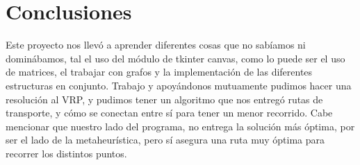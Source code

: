 \documentclass[10pt,twocolumn,letterpaper]{article}
\begin{document}
\section{Conclusiones}
Este proyecto nos llevó a aprender diferentes cosas que no sabíamos ni dominábamos, tal el uso del módulo de tkinter canvas, como lo puede ser el uso de matrices, el trabajar con grafos y la implementación de las diferentes estructuras en conjunto. Trabajo y apoyándonos mutuamente pudimos hacer una resolución al VRP, y pudimos tener un algoritmo que nos entregó rutas de transporte, y cómo se conectan entre sí para tener un menor recorrido. Cabe mencionar que nuestro lado del programa, no entrega la solución más óptima, por ser el lado de la metaheurística, pero sí asegura una ruta muy óptima para recorrer los distintos puntos.


\nocite{*} %

\clearpage


\end{document}
